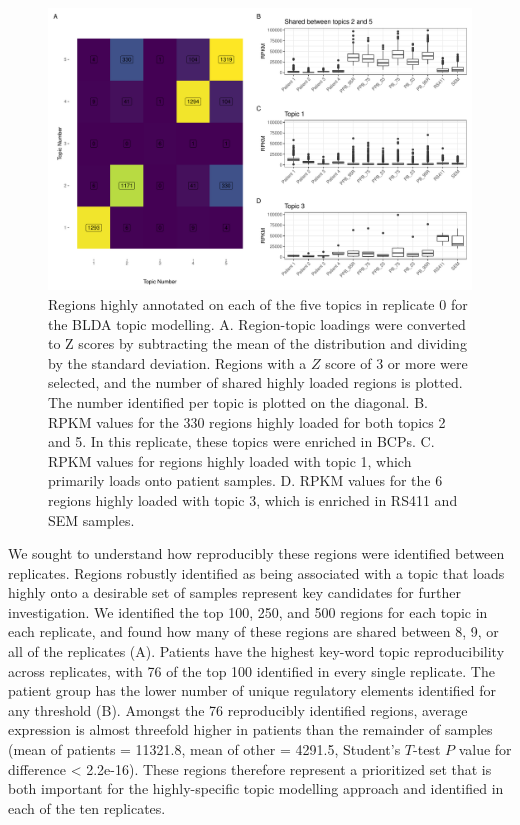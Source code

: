 \begin{figure}
    \centering
    \includegraphics[width=\textwidth]{plot/ch5/mll_bigwig_region_sharing_plot_rep0.pdf}
    \caption{Regions highly annotated on each of the five topics in replicate 0 for the BLDA topic modelling. A. Region-topic loadings were converted to Z scores by subtracting the mean of the distribution and dividing by the standard deviation. Regions with a $Z$ score of 3 or more were selected, and the number of shared highly loaded regions is plotted. The number identified per topic is plotted on the diagonal. B. RPKM values for the 330 regions highly loaded for both topics 2 and 5. In this replicate, these topics were enriched in BCPs. C. RPKM values for regions highly loaded with topic 1, which primarily loads onto patient samples. D. RPKM values for the 6 regions highly loaded with topic 3, which is enriched in RS411 and SEM samples.}
    \label{fig:mll_region_sharing}
\end{figure}


We sought to understand how reproducibly these regions were identified between replicates. 
Regions robustly identified as being associated with a topic that loads highly onto a desirable set of samples represent key candidates for further investigation.
We identified the top 100, 250, and 500 regions for each topic in each replicate, and found how many of these regions are shared between 8, 9, or all of the replicates (A). Patients have the highest key-word topic reproducibility across replicates, with 76 of the top 100 identified in every single replicate. The patient group has the lower number of unique regulatory elements identified for any threshold (B). Amongst the 76 reproducibly identified regions, average expression is almost threefold higher in patients than the remainder of samples (mean of patients = 11321.8, mean of other = 4291.5, Student's $T$-test $P$ value for difference < 2.2e-16). These regions therefore represent a prioritized set that is both important for the highly-specific topic modelling approach and identified in each of the ten replicates. 

